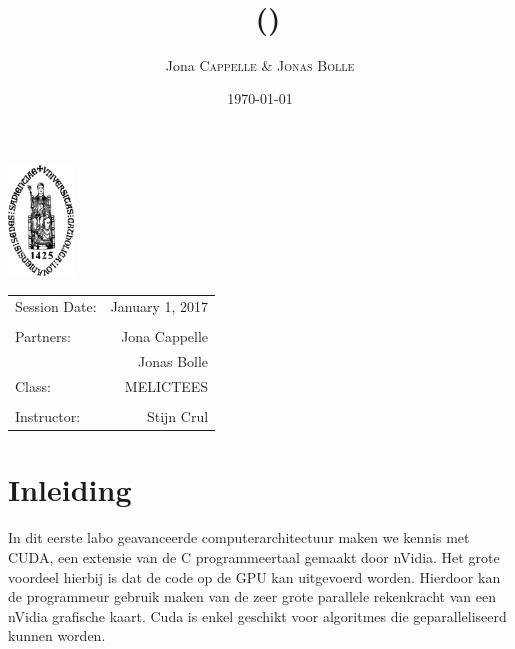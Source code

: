 \documentclass[twoside,a4paper]{article}
\title{\maintitle \\ \course \\{\small\ (\coursenumber)}} %
\author{Jona \textsc{Cappelle} \& \textsc{Jonas Bolle}} %
\date{\today} %
\newcommand{\class}{MELICTEES}
\begin{document}
\sloppy %
\begin{titlepage}
\maketitle %

\vfill
\begin{center}
\includegraphics[width=0.13\textwidth]{logo_kuleuven.png} %
\end{center}
\vfill
\vfill
\vfill

\begin{center}
\begin{tabular}{l r}
Session Date: & January 1, 2017 \\ %
\\
Partners: &  Jona Cappelle\\ %
&  Jonas Bolle\\
Class: & \class \\
\\
Instructor: &  Stijn Crul%
\end{tabular}
\end{center}
\vfill
\vfill
\end{titlepage}
\clearpage
\newpage\null\thispagestyle{empty}\newpage %



\restoregeometry%

\tableofcontents
\listoffigures
\listoftables
\listoflistings%
\clearpage

\section{Inleiding}
In dit eerste labo geavanceerde computerarchitectuur maken we kennis met CUDA, een extensie van de C programmeertaal gemaakt door nVidia. Het grote voordeel hierbij is dat de code op de GPU kan uitgevoerd worden. Hierdoor kan de programmeur gebruik maken van de zeer grote parallele rekenkracht van een nVidia grafische kaart. Cuda is enkel geschikt voor algoritmes die geparalleliseerd kunnen worden.
\end{document}
